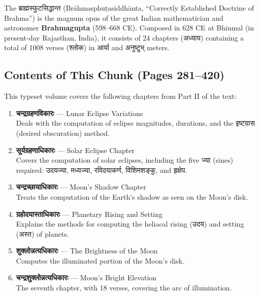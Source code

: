 \documentclass[11pt,a4paper]{article}
\newcommand{\dev}[1]{{\devanagarifont #1}}
\begin{document}
The \dev{ब्राह्मस्फुटसिद्धान्त} (Brāhmasphuṭasiddhānta, ``Correctly Established
Doctrine of Brahma'') is the magnum opus of the great Indian mathematician
and astronomer \textbf{Brahmagupta} (598--668 CE). Composed in 628 CE at
Bhinmal (in present-day Rajasthan, India), it consists of 24 chapters
(\dev{अध्याय}) containing a total of 1008 verses (\dev{श्लोक}) in
\dev{आर्या} and \dev{अनुष्टुभ्} meters.

\subsection*{Contents of This Chunk (Pages 281--420)}

This typeset volume covers the following chapters from Part II of the text:

\begin{enumerate}
\item \textbf{\dev{चन्द्रग्रहणविकारः}} — Lunar Eclipse Variations \\
  Deals with the computation of eclipse magnitudes, durations, and the
  \dev{इष्टग्रास} (desired obscuration) method.

\item \textbf{\dev{सूर्यग्रहणाधिकारः}} — Solar Eclipse Chapter \\
  Covers the computation of solar eclipses, including the five \dev{ज्या}
  (sines) required: \dev{उदयज्या}, \dev{मध्यज्या}, \dev{रविदयाकर्ण},
  \dev{विशिमशङ्कु}, and \dev{हृक्षेप}.

\item \textbf{\dev{चन्द्रच्छायाधिकारः}} — Moon's Shadow Chapter \\
  Treats the computation of the Earth's shadow as seen on the Moon's disk.

\item \textbf{\dev{ग्रहोदयास्ताधिकारः}} — Planetary Rising and Setting \\
  Explains the methods for computing the heliacal rising (\dev{उदय}) and
  setting (\dev{अस्त}) of planets.

\item \textbf{\dev{शुक्लोन्नत्यधिकारः}} — The Brightness of the Moon \\
  Computes the illuminated portion of the Moon's disk.

\item \textbf{\dev{चन्द्रशुक्लोन्नत्यधिकारः}} — Moon's Bright Elevation \\
  The seventh chapter, with 18 verses, covering the arc of illumination.
\end{enumerate}
\end{document}
